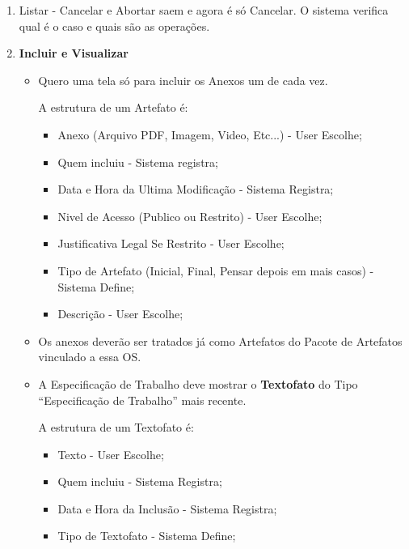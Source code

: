 	\begin{enumerate}
		\item Listar - Cancelar e Abortar saem e agora é só Cancelar. O sistema verifica qual é o caso e quais são as operações.
		
		\item \textbf{Incluir e Visualizar}
		
		\begin{itemize}
			\item Quero uma tela só para incluir os Anexos um de cada vez.
			
			
			A estrutura de um Artefato é:
			\begin{itemize}			
				\item Anexo (Arquivo PDF, Imagem, Video, Etc...) - User Escolhe;
				\item Quem incluiu - Sistema registra;
				\item Data e Hora da Ultima Modificação - Sistema Registra;
				\item Nivel de Acesso (Publico ou Restrito) - User Escolhe;
				\item Justificativa Legal Se Restrito - User Escolhe;
				\item Tipo de Artefato (Inicial, Final, Pensar depois em mais casos) - Sistema Define;
				\item Descrição - User Escolhe;
			\end{itemize}		
			
			
			\item Os anexos deverão ser tratados já como Artefatos do Pacote de Artefatos vinculado a essa OS.
			
			
			\item A Especificação de Trabalho deve mostrar o \textbf{Textofato} do Tipo ``Especificação de Trabalho'' mais recente.
			
			
			A estrutura de um Textofato é:
			\begin{itemize}			
				\item Texto - User Escolhe;
				\item Quem incluiu - Sistema Registra;
				\item Data e Hora da Inclusão - Sistema Registra;
				\item Tipo de Textofato - Sistema Define;
			\end{itemize}		
			
			
		\end{itemize}
	\end{enumerate}
